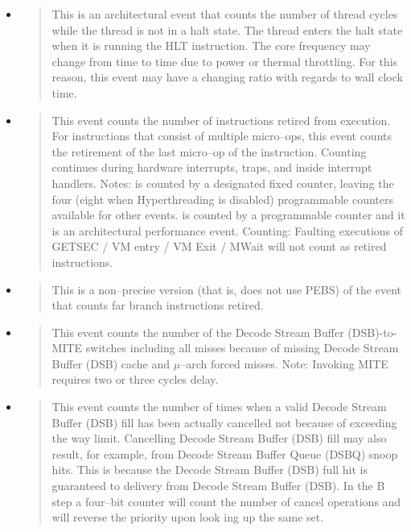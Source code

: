 \begin{itemize}

\item {}
\begin{quotation}
This is an architectural event that counts the number of thread cycles while the
thread is not in a halt state. The thread enters the halt state when it is
running the HLT instruction. The core frequency may change from time to time due
to power or thermal throttling. For this reason, this event may have a changing
ratio with regards to wall clock time.
\end{quotation}

\item {}
\begin{quotation}

This event counts the number of instructions retired from execution. For
instructions that consist of multiple micro--ops, this event counts the
retirement of the last micro--op of the instruction. Counting continues during
hardware interrupts, traps, and inside interrupt handlers. Notes:
 is counted by a designated fixed counter, leaving
the four (eight when Hyper\-threading is disabled) programmable counters
available for other events.  is counted by
a programmable counter and it is an architectural performance event. Counting:
Faulting executions of GETSEC / VM entry / VM Exit / MWait will not count as
retired instructions.

\end{quotation}

\item {}
\begin{quotation}
This is a non--precise version (that is, does not use PEBS) of the event that
counts far branch instructions retired.
\end{quotation}

\item {} \begin{quotation} This event counts the
number of the Decode Stream Buffer (DSB)-\-to-\-MITE swit\-ches including all
misses because of missing Decode Stream Buffer (DSB) cache and $\mu$--arch
forced misses. Note: Invoking MITE requires two or three cycles delay.
\end{quotation}

\item {}
\begin{quotation}
This event counts the number of times when a valid Decode Stream Buffer (DSB)
fill has been actually cancelled not because of exceeding the way limit.
Cancelling Decode Stream Buffer (DSB) fill may also result, for example, from
Decode Stream Buffer Queue (DSBQ) snoop hits. This is because the Decode Stream
Buffer (DSB) full hit is guaranteed to delivery from Decode Stream Buffer (DSB).
In the B step a four--bit counter will count the number of cancel operations and
will reverse the priority upon look ing up the same set.
\end{quotation}


\end{itemize}
